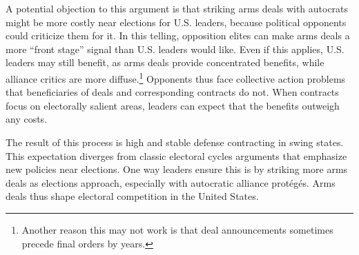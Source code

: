 \documentclass[12pt]{article}
\begin{document}
A potential objection to this argument is that striking arms deals with autocrats might be more costly near elections for U.S. leaders, because political opponents could criticize them for it. 
In this telling, opposition elites can make arms deals a more ``front stage'' signal than U.S. leaders would like. 
Even if this applies, U.S. leaders may still benefit, as arms deals provide concentrated benefits, while alliance critics are more diffuse.\footnote{Another reason this may not work is that deal announcements sometimes precede final orders by years.}
Opponents thus face collective action problems that beneficiaries of deals and corresponding contracts do not. 
When contracts focus on electorally salient areas, leaders can expect that the benefits outweigh any costs. 







The result of this process is high and stable defense contracting in swing states.
This expectation diverges from classic electoral cycles arguments that emphasize new policies near elections. 
One way leaders ensure this is by striking more arms deals as elections approach, especially with autocratic alliance prot{\'e}g{\'e}s.
Arms deals thus shape electoral competition in the United States. 
\end{document}
